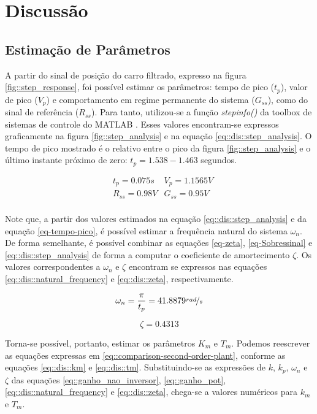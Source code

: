 \section{Discussão}

\subsection{Estimação de Parâmetros}
A partir do sinal de posição do carro filtrado, expresso na figura \ref{fig::step_response}, foi possível estimar os parâmetros: tempo de pico ($t_p$), valor de pico ($V_p$) e comportamento em regime permanente do sistema ($G_{ss}$), como do sinal de referência ($R_{ss}$). Para tanto, utilizou-se a função \textit{stepinfo()} da toolbox de sistemas de controle do MATLAB \cite{Grace:1992:MATLAB_Control_Toolbox}. Esses valores encontram-se expressos graficamente na figura \ref{fig::step_analysis} e na equação \ref{eq::dis::step_analysis}. O tempo de pico mostrado é o relativo entre o pico da figura \ref{fig::step_analysis} e o último instante próximo de zero: $t_p = 1.538 - 1.463$ segundos.

\begin{equation}
\begin{aligned}
& t_p = 0.075s & V_p = 1.1565V \\
& R_{ss} = 0.98V & G_{ss} = 0.95V \\
\end{aligned}
\label{eq::dis::step_analysis}
\end{equation}

Note que, a partir dos valores estimados na equação \ref{eq::dis::step_analysis} e da equação \ref{eq-tempo-pico}, é possível estimar a frequência natural do sistema $\omega_n$. De forma semelhante, é possível combinar as equações \ref{eq-zeta}, \ref{eq-Sobressinal} e \ref{eq::dis::step_analysis} de forma a computar o coeficiente de amortecimento $\zeta$. Os valores correspondentes a $\omega_n$ e $\zeta $ encontram se expressos nas equações \ref{eq::dis::natural_frequency} e \ref{eq::dis::zeta}, respectivamente.

\begin{equation}
\omega_n = \frac{\pi}{t_p} = 41.8879\nicefrac{rad}{s}
\label{eq::dis::natural_frequency}
\end{equation}

\begin{equation}
\zeta = 0.4313
\label{eq::dis::zeta}
\end{equation}

Torna-se possível, portanto, estimar os parâmetros $K_m$ e $T_m$. Podemos reescrever as equações expressas em \ref{eq::comparison-second-order-plant}, conforme as equações \ref{eq::dis::km} e \ref{eq::dis::tm}. Substituindo-se as expressões de $k$, $k_p$, $\omega_n$ e $\zeta$ das equações \ref{eq::ganho_nao_inversor}, \ref{eq::ganho_pot}, \ref{eq::dis::natural_frequency} e \ref{eq::dis::zeta}, chega-se a valores numéricos para $k_m$ e $T_m$.

